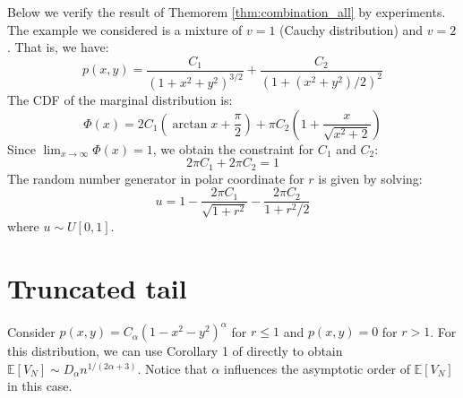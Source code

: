 \documentclass{article}
\def\E{\mathbb{E}}
\begin{document}
Below we verify the result of Themorem \ref{thm:combination_all}
by experiments. The example we considered is a mixture of $v=1$
(Cauchy distribution) and $v=2$. That is, we have:
\begin{equation}
    p(x,y) = \frac{C_1}{(1+x^2+y^2)^{3/2}}
    + \frac{C_2}{(1+(x^2+y^2)/2)^{2}}
\end{equation}
The CDF of the marginal distribution is:
\begin{equation}
    \Phi(x) = 2C_1 (\arctan x + \frac{\pi}{2})
    + \pi C_2 (1 + \frac{x}{\sqrt{x^2 + 2}})
\end{equation}
Since $\lim_{x\to \infty} \Phi(x) = 1$,
we obtain the constraint for $C_1$ and $C_2$:
\begin{equation}
2\pi C_1 + 2 \pi C_2 = 1    
\end{equation}
The random number generator in polar coordinate
for $r$ is given by solving:
\begin{equation}
    u = 1 - \frac{2\pi C_1}{\sqrt{1+r^2}} - \frac{2\pi C_2}{1+r^2/2}
\end{equation}
where $u\sim U[0,1]$.

\section{Truncated tail}
Consider  $p(x,y) = C_{\alpha}(1-x^2-y^2)^{\alpha}$ for $r\leq 1$
and $p(x,y)=0$ for $r>1$.
For this distribution, we can use
Corollary 1 of \cite{affentranger1991convex}
directly to obtain
$\E[V_N] \sim D_{\alpha} n^{1/(2\alpha + 3)}$.
Notice that $\alpha$ influences the asymptotic order of
$\E[V_N]$ in this case.


\end{document}
